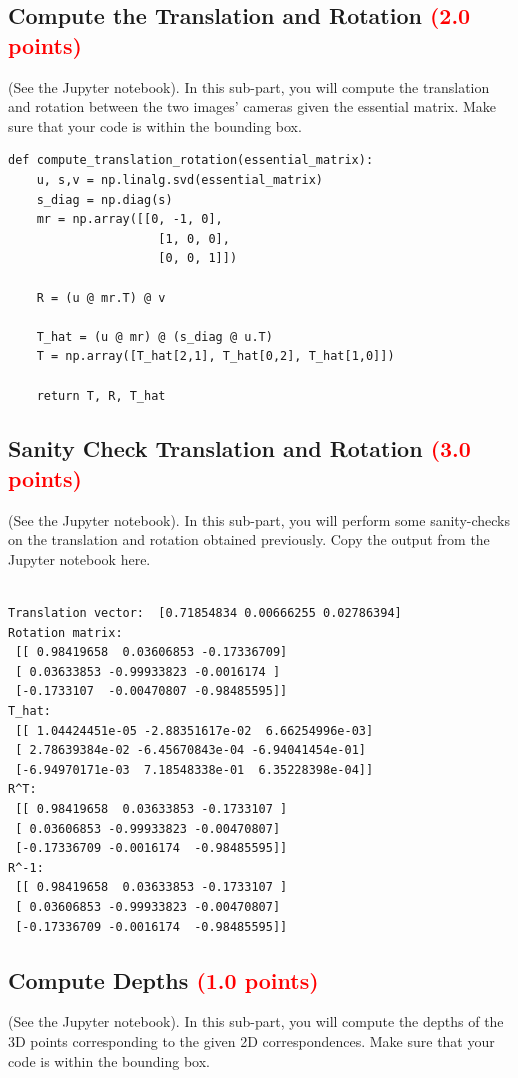 \documentclass[answers]{exam}
\newcommand{\mypoints}[1]{\textcolor{red}{(#1 points)}}
\begin{document}
\subsection{Compute the Translation and Rotation \mypoints{2.0}}
(See the Jupyter notebook). In this sub-part, you will compute the translation and rotation between the two images' cameras given the essential matrix. Make sure that your code is within the bounding box.
\begin{solution}
\begin{verbatim}
def compute_translation_rotation(essential_matrix):
    u, s,v = np.linalg.svd(essential_matrix)
    s_diag = np.diag(s)
    mr = np.array([[0, -1, 0],
                     [1, 0, 0],
                     [0, 0, 1]])
    
    R = (u @ mr.T) @ v
    
    T_hat = (u @ mr) @ (s_diag @ u.T)
    T = np.array([T_hat[2,1], T_hat[0,2], T_hat[1,0]])
    
    return T, R, T_hat

\end{verbatim}
\end{solution}
 
\subsection{Sanity Check Translation and Rotation \mypoints{3.0}}
(See the Jupyter notebook). In this sub-part, you will perform some sanity-checks on the translation and rotation obtained previously. Copy the output from the Jupyter notebook here.
\begin{solution}
\begin{verbatim}

Translation vector:  [0.71854834 0.00666255 0.02786394]
Rotation matrix: 
 [[ 0.98419658  0.03606853 -0.17336709]
 [ 0.03633853 -0.99933823 -0.0016174 ]
 [-0.1733107  -0.00470807 -0.98485595]]
T_hat: 
 [[ 1.04424451e-05 -2.88351617e-02  6.66254996e-03]
 [ 2.78639384e-02 -6.45670843e-04 -6.94041454e-01]
 [-6.94970171e-03  7.18548338e-01  6.35228398e-04]]
R^T: 
 [[ 0.98419658  0.03633853 -0.1733107 ]
 [ 0.03606853 -0.99933823 -0.00470807]
 [-0.17336709 -0.0016174  -0.98485595]]
R^-1: 
 [[ 0.98419658  0.03633853 -0.1733107 ]
 [ 0.03606853 -0.99933823 -0.00470807]
 [-0.17336709 -0.0016174  -0.98485595]]
\end{verbatim}
\end{solution}

\subsection{Compute Depths \mypoints{1.0}}
(See the Jupyter notebook). In this sub-part, you will compute the depths of the 3D points corresponding to the given 2D correspondences. Make sure that your code is within the bounding box.
\end{document}
